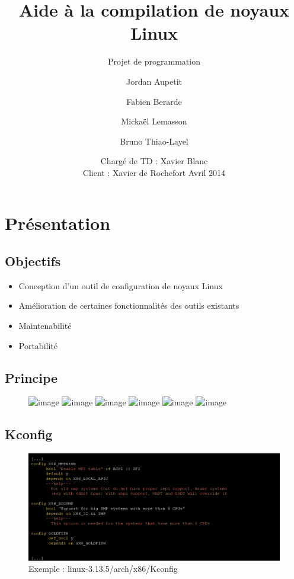 \documentclass[11pt]{beamer}
\title[Aide à la compilation de noyaux Linux]{Aide à la compilation de noyaux Linux}
\subtitle {Projet de programmation}
\author[Aupetit Jordan, Berarde Fabien, Mickaël Lemasson, Bruno Thiao-Layel]
        {Jordan Aupetit \and Fabien Berarde \and Mickaël Lemasson \and Bruno Thiao-Layel}
\date[16 Avril 2014]{
    	    \vspace{-0.5cm}
            \newline Chargé de TD : Xavier Blanc\\
                     Client : Xavier de Rochefort
            \newline
            16 Avril 2014}
\let\reallydohead\dohead
\newenvironment{nonavig}
               {\let\dohead\relax}
               {\let\dohead\reallydohead}
\begin{document}
\begin{nonavig}
\begin{frame}
  \titlepage
\end{frame}
\end{nonavig}

\section{Présentation}
\subsection{Objectifs}
\begin{frame}
    \begin{itemize}
        \setlength{\itemsep}{20pt}
        \item Conception d'un outil de configuration de noyaux Linux
        \item Amélioration de certaines fonctionnalités des outils existants
        \item Maintenabilité
        \item Portabilité
    \end{itemize}
\end{frame}

\subsection{Principe}
\begin{frame}
    \begin{figure}
        \includegraphics<1-1>[scale=0.25]{screen_principe_1.png}
        \includegraphics<2-2>[scale=0.25]{screen_principe_2.png}
        \includegraphics<3-3>[scale=0.25]{screen_principe_3.png}
        \includegraphics<4-4>[scale=0.25]{screen_principe_4.png}
        \includegraphics<5-5>[scale=0.25]{screen_principe_5.png}
        \includegraphics<6-6>[scale=0.25]{screen_principe_6.png}
        \centering
    \end{figure}
\end{frame}


\subsection{Kconfig}
\begin{frame}[fragile]
    \begin{figure}
        \caption{Exemple : linux-3.13.5/arch/x86/Kconfig}
        \includegraphics[scale=0.35]{ex_kconfig.png}
        \centering
    \end{figure}
\end{frame}
\end{document}
